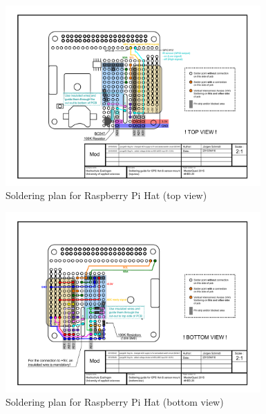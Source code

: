 \begin{figure}[H]
    \centering
    \includegraphics[width=0.87\textwidth]{fig/ch-rpi-hardware/A4_tech_draw_topview_gpshat_soldering}
    \caption{Soldering plan for Raspberry Pi Hat (top view)}
    \label{fig:hardware:soldering:top}
\end{figure}

\begin{figure}[H]
    \centering
    \includegraphics[width=0.87\textwidth]{fig/ch-rpi-hardware/A4_tech_draw_bottomview_gpshat_soldering}
    \caption{Soldering plan for Raspberry Pi Hat (bottom view)}
    \label{fig:hardware:soldering:bottom}
\end{figure}

